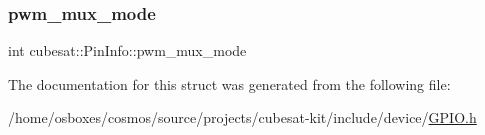 \subsubsection{\texorpdfstring{pwm\+\_\+mux\+\_\+mode}{pwm\_mux\_mode}}
{\footnotesize\ttfamily int cubesat\+::\+Pin\+Info\+::pwm\+\_\+mux\+\_\+mode}



The documentation for this struct was generated from the following file\+:\begin{DoxyCompactItemize}
\item 
/home/osboxes/cosmos/source/projects/cubesat-\/kit/include/device/\hyperlink{GPIO_8h}{G\+P\+I\+O.\+h}\end{DoxyCompactItemize}
